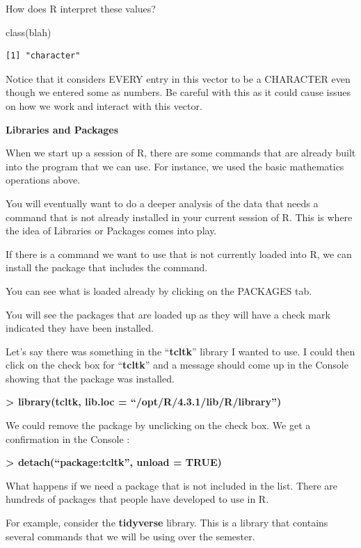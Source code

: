 \documentclass[
  letterpaper,
  DIV=11,
  numbers=noendperiod]{scrreprt}
\newenvironment{Shaded}{\begin{snugshade}}{\end{snugshade}}
\newcommand{\FunctionTok}[1]{\textcolor[rgb]{0.28,0.35,0.67}{#1}}
\newcommand{\NormalTok}[1]{\textcolor[rgb]{0.00,0.23,0.31}{#1}}
\begin{document}
How does R interpret these values?

\begin{Shaded}
\begin{Highlighting}[]
\FunctionTok{class}\NormalTok{(blah)}
\end{Highlighting}
\end{Shaded}

\begin{verbatim}
[1] "character"
\end{verbatim}

Notice that it considers EVERY entry in this vector to be a CHARACTER
even though we entered some as numbers. Be careful with this as it could
cause issues on how we work and interact with this vector.

\textbf{Libraries and Packages}

When we start up a session of R, there are some commands that are
already built into the program that we can use. For instance, we used
the basic mathematics operations above.

You will eventually want to do a deeper analysis of the data that needs
a command that is not already installed in your current session of R.
This is where the idea of Libraries or Packages comes into play.

If there is a command we want to use that is not currently loaded into
R, we can install the package that includes the command.

You can see what is loaded already by clicking on the PACKAGES tab.

You will see the packages that are loaded up as they will have a check
mark indicated they have been installed.

Let's say there was something in the ``\textbf{tcltk}'' library I wanted
to use. I could then click on the check box for ``\textbf{tcltk}'' and a
message should come up in the Console showing that the package was
installed.

\textbf{\textgreater{} library(tcltk, lib.loc =
``/opt/R/4.3.1/lib/R/library'')}

We could remove the package by unclicking on the check box. We get a
confirmation in the Console :

\textbf{\textgreater{} detach(``package:tcltk'', unload = TRUE)}

What happens if we need a package that is not included in the list.
There are hundreds of packages that people have developed to use in R.

For example, consider the \textbf{tidyverse} library. This is a library
that contains several commands that we will be using over the semester.
\end{document}
